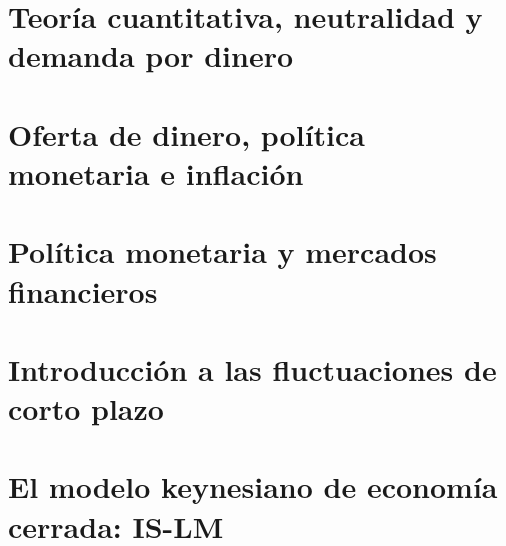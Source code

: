 \documentclass{article}
\numberwithin{figure}{section}
\begin{document}
\section{Teoría cuantitativa, neutralidad y demanda por dinero}
    
    

\section{Oferta de dinero, política monetaria e inflación}
    
    
    
    
    
\section{Política monetaria y mercados financieros}

\section{Introducción a las fluctuaciones de corto plazo}
    
    
    
    
    
    
    
    
    
    

\section{El modelo keynesiano de economía cerrada: IS-LM}
    
    
    
    
    
    
    
    
    
    
    
    
    
    
    
    
    
    
\end{document}
